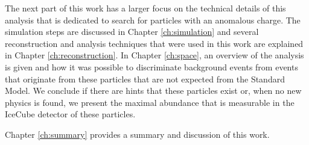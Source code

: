 The next part of this work has a larger focus on the technical details of this analysis that is dedicated to search for particles with an anomalous charge. The simulation steps are discussed in Chapter \ref{ch:simulation} and several reconstruction and analysis techniques that were used in this work are explained in Chapter \ref{ch:reconstruction}. In Chapter \ref{ch:space}, an overview of the analysis is given and how it was possible to discriminate background events from events that originate from these particles that are not expected from the Standard Model. We conclude if there are hints that these particles exist or, when no new physics is found, we present the maximal abundance that is measurable in the IceCube detector of these particles.

Chapter \ref{ch:summary} provides a summary and discussion of this work.